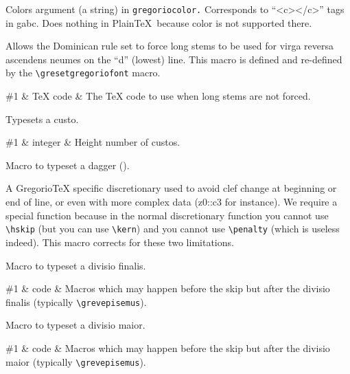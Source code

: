 Colors argument (a string) in \verb=gregoriocolor.=  Corresponds to ``<c></c>'' tags in gabc.  Does nothing in Plain\TeX\ because color is not supported there.

Allows the Dominican rule set to force long stems to be used for virga
reversa ascendens neumes on the ``d'' (lowest) line.  This macro is
defined and re-defined by the \verb=\gresetgregoriofont= macro.

\begin{argtable}
  \#1 & \TeX{} code & The \TeX{} code to use when long stems are not forced.\\
\end{argtable}

Typesets a custo.

\begin{argtable}
  \#1 & integer & Height number of custos.\\
\end{argtable}

Macro to typeset a dagger (\GreDagger).

A GregorioTeX specific discretionary used to avoid clef change at beginning or end of line, or even with more complex data (z0::c3 for instance).  We require a special function because in the normal discretionary function you cannot use \verb=\hskip= (but you can use \verb=\kern=) and you cannot use \verb=\penalty= (which is useless indeed).  This macro corrects for these two limitations.

Macro to typeset a divisio finalis.

\begin{argtable}
  \#1 & code & Macros which may happen before the skip but after the divisio finalis (typically \verb=\grevepisemus=).\\
\end{argtable}

Macro to typeset a divisio maior.

\begin{argtable}
  \#1 & code & Macros which may happen before the skip but after the divisio maior (typically \verb=\grevepisemus=).\\
\end{argtable}

